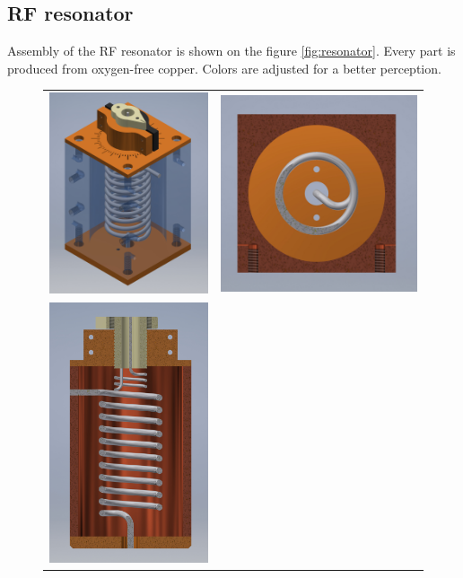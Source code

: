 \clearpage
\subsection{RF resonator}
\label{subsection:rf_resonator_3d}
Assembly of the RF resonator is shown on the figure \ref{fig:resonator}. Every part is produced from oxygen-free copper. Colors are adjusted for a better perception.

\begin{figure}[h]
	\centering
	\begin{tabular}{c c}
		\includegraphics[width=.49\textwidth]{images/resonator_water_small} 
		& 
		\includegraphics[width=.49\textwidth]{images/resonator_XZ_small}
		\\
		\includegraphics[width=.44\textwidth]{images/resonator_XY_small} 

\end{tabular}
\end{figure}
